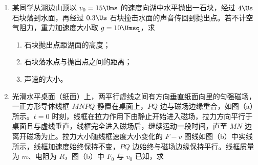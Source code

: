 \documentclass[\gkver]{gaokaozhenti}
\begin{document}
\begin{enumerate}
\item
某同学从湖边山顶以 $v_{0}=15\Ums$ 的速度向湖中水平抛出一石块，经过 $4\Us$ 石块落到水面，再经过 $0.3\Us$ 石块撞击水面的声音传回到抛出点。若不计空气阻力，重力加速度大小取 $g=10\Umsq$，求

\begin{enumerate}
	\item
	石块抛出点距湖面的高度；
	\item
	石块落水点与抛出点之间的距离；
	\item
	声速的大小。
\end{enumerate}



\item
光滑水平桌面（纸面）上，两平行虚线之间有方向垂直纸面向里的匀强磁场，一正方形导体线框 $MNPQ$ 静置在桌面上，$PQ$ 边与磁场边缘重合，如图（a）所示。$t=0$ 时刻，线框在拉力作用下由静止开始进入磁场，拉力方向平行于桌面且与虚线垂直，线框完全进入磁场后，继续运动一段时间，直至 $MN$ 边离开磁场为止。拉力大小随线框速度大小变化的 $F-v$ 图线如图（b）中实线所示，线框加速度始终保持不变，$PQ$ 边始终与磁场边缘保持平行。线框质量为 $m$、电阻为 $R$，图（b）中 $F_{0}$ 与 $v_{0}$ 已知，求


\end{enumerate}
\end{document}
